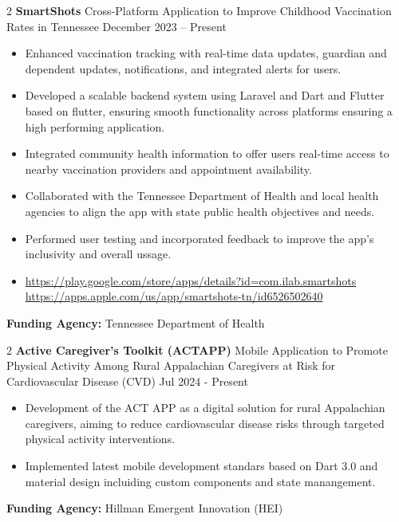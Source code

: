 \documentclass[10pt, letterpaper]{article}
\newenvironment{highlights}{
    \begin{itemize}[
        topsep=0.10 cm,
        parsep=0.10 cm,
        partopsep=0pt,
        itemsep=0pt,
        leftmargin=0 cm + 10pt
    ]
}{
    \end{itemize}
} %
\newenvironment{twocolentry}[2][]{
    \onecolentry
    \def\secondColumn{#2}
    \setcolumnwidth{\fill, 4.5 cm}
    \begin{paracol}{2}
}{
    \switchcolumn \raggedleft \secondColumn
    \end{paracol}
    \endonecolentry
} %
\begin{document}
            \vspace{0.3cm} \begin{twocolentry}{December 2023 – Present} \textbf{SmartShots} \textbar Cross-Platform Application to Improve Childhood Vaccination Rates in Tennessee \end{twocolentry} \begin{highlights} 
                \item Enhanced vaccination tracking with real-time data updates, guardian and dependent updates, notifications, and integrated alerts for users. 
                \item Developed a scalable backend system using Laravel and Dart and Flutter based on flutter, ensuring smooth functionality across platforms ensuring a high performing application. 
                \item Integrated community health information to offer users real-time access to nearby vaccination providers and appointment availability.
                 \item Collaborated with the Tennessee Department of Health and local health agencies to align the app with state public health objectives and needs. 
                 \item Performed user testing and incorporated feedback to improve the app’s inclusivity and overall ussage. 
                 \item \url{https://play.google.com/store/apps/details?id=com.ilab.smartshots} \url{https://apps.apple.com/us/app/smartshots-tn/id6526502640} \end{highlights} \vspace{0.3cm} \noindent \textbf{Funding Agency:} Tennessee Department of Health
        
        \vspace{0.3cm} \begin{twocolentry}{Jul 2024 - Present} \textbf{Active Caregiver’s Toolkit (ACTAPP)} \textbar Mobile Application to Promote Physical Activity Among Rural Appalachian Caregivers at Risk for Cardiovascular Disease (CVD) \end{twocolentry} \begin{highlights} 
            \item Development of the ACT APP as a digital solution for rural Appalachian caregivers, aiming to reduce cardiovascular disease risks through targeted physical activity interventions. 
            \item Implemented latest mobile development standars based on Dart 3.0 and material design incluiding custom components and state manangement.
        \end{highlights} \vspace{0.3cm} \noindent \textbf{Funding Agency:} Hillman Emergent Innovation (HEI)
\end{document}
